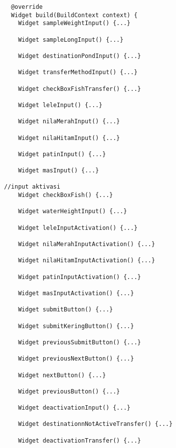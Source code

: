 \begin{lstlisting}
          @override
          Widget build(BuildContext context) {
            Widget sampleWeightInput() {...}
        
            Widget sampleLongInput() {...}
        
            Widget destinationPondInput() {...}
        
            Widget transferMethodInput() {...}
        
            Widget checkBoxFishTransfer() {...}
        
            Widget leleInput() {...}
        
            Widget nilaMerahInput() {...}
        
            Widget nilaHitamInput() {...}
        
            Widget patinInput() {...}
        
            Widget masInput() {...}
        
        //input aktivasi
            Widget checkBoxFish() {...}
        
            Widget waterHeightInput() {...}
        
            Widget leleInputActivation() {...}
        
            Widget nilaMerahInputActivation() {...}
        
            Widget nilaHitamInputActivation() {...}
        
            Widget patinInputActivation() {...}
        
            Widget masInputActivation() {...}
        
            Widget submitButton() {...}
        
            Widget submitKeringButton() {...}
        
            Widget previousSubmitButton() {...}
        
            Widget previousNextButton() {...}
        
            Widget nextButton() {...}
        
            Widget previousButton() {...}
        
            Widget deactivationInput() {...}
        
            Widget destinationnNotActiveTransfer() {...}
        
            Widget deactivationTransfer() {...}
        

\end{lstlisting}
